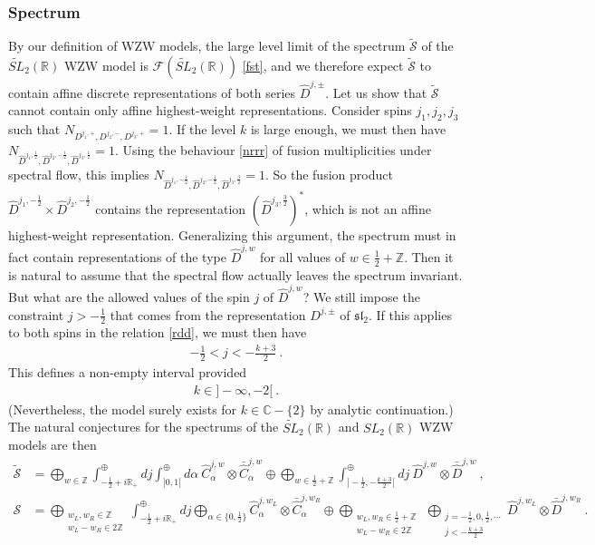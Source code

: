 \documentclass[12pt, a4paper, notitlepage, twoside]{report}
\numberwithin{equation}{section}
\theoremstyle{break}
\begin{document}
\subsubsection{Spectrum}

By our definition of WZW models, the large level limit of the spectrum $\tilde{\mathcal{S}}$ of the $\widetilde{SL}_2(\mathbb{R})$ WZW model is $\mathcal{F}(\widetilde{SL}_2(\mathbb{R}))$ \eqref{fst}, and we therefore expect $\tilde{\mathcal{S}}$ to contain affine discrete representations of both series $\hat{D}^{j,\pm}$.
Let us show that $\tilde{\mathcal{S}}$ cannot contain only affine highest-weight representations.
Consider spins $j_1,j_2,j_3$ such that $N_{D^{j_1,+},D^{j_2,-},D^{j_3,+}}=1$.
If the level $k$ is large enough, we must then have $N_{\hat{D}^{j_1,\frac12},\hat{D}^{j_2,-\frac12},\hat{D}^{j_3,\frac12}}=1$.
Using the behaviour \eqref{nrrr} of fusion multiplicities under spectral flow, this implies $N_{\hat{D}^{j_1,-\frac12},\hat{D}^{j_2,-\frac12},\hat{D}^{j_3,\frac32}}=1$.
So the fusion product $\hat{D}^{j_1,-\frac12}\times \hat{D}^{j_2,-\frac12}$ contains the representation $(\hat{D}^{j_3,\frac32})^*$, which is not an affine highest-weight representation.
Generalizing this argument, the spectrum must in fact contain 
representations of the type $\hat{D}^{j,w}$ for all values of $w\in \frac12+{\mathbb{Z}}$.
Then it is natural to assume that the spectral flow actually leaves the spectrum invariant.
But what are the allowed values of the spin $j$ of $\hat{D}^{j,w}$? We still impose the constraint $j>-\frac12$ that comes from the representation $D^{j,\pm}$ of $\mathfrak{sl}_2$.
If this applies to both spins in the relation \eqref{rdd}, we must then have 
\begin{align}
 -\frac12 <j < -\frac{k+3}{2}\ .
\label{jimm}
\end{align}
This defines a non-empty interval provided
\begin{align}
 \boxed{k\in]-\infty,-2[}\ .
\end{align}
(Nevertheless, the model surely exists for $k\in \mathbb{C}-\{2\}$ by analytic continuation.)
The natural conjectures for the spectrums of the $\widetilde{SL}_2(\mathbb{R})$ and $SL_2(\mathbb{R})$ WZW models are then
\begin{align}
 \tilde{\mathcal{S}} &= \bigoplus_{w\in{\mathbb{Z}}}\int^\oplus_{-\frac12+i{\mathbb{R}}_+} dj \int^\oplus_{]0,1[} d\alpha\ \hat{C}^{j,w}_\alpha \otimes \bar{\hat{C}}^{j,w}_{\alpha} 
\oplus \bigoplus_{w\in\frac12+{\mathbb{Z}}}\int^\oplus_{]-\frac12,-\frac{k+3}{2}[} dj\ \hat{D}^{j,w}\otimes \bar{\hat{D}}^{j,w} \ ,
\\
 \mathcal{S} &= \bigoplus_{\substack{w_L,w_R\in{\mathbb{Z}}\\ w_L-w_R\in 2{\mathbb{Z}}}}\int^\oplus_{-\frac12+i{\mathbb{R}}_+} dj \bigoplus_{\alpha\in\{0,\frac12\}} \hat{C}^{j,w_L}_\alpha \otimes \bar{\hat{C}}^{j,w_R}_{\alpha} \oplus  \bigoplus_{\substack{w_L,w_R\in\frac12+{\mathbb{Z}}\\ w_L-w_R\in 2{\mathbb{Z}}}}\ \bigoplus_{\substack{j= -\frac12, 0,\frac12,\cdots \\ j<-\frac{k+3}{2}}} \hat{D}^{j,w_L}\otimes \bar{\hat{D}}^{j,w_R} \ .
\end{align}
\end{document}
